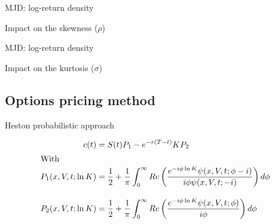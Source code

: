 \documentclass{beamer}
\begin{document}
\begin{frame}{MJD: log-return density}

\begin{block}{Impact on the skewness ($\rho$)}
\begin{figure}[ht]
\centering

\end{figure}
\end{block}
\end{frame}

\begin{frame}{MJD: log-return density}
\begin{block}{Impact on the kurtosis ($\sigma$)}
\begin{figure}[ht]
\centering

\end{figure}

\end{block}
 
\end{frame}





\subsection{Options pricing method}
\begin{frame}{Heston probabilistic approach}


\begin{align}
  c(t) &= S(t) P_1 - e^{-r(T-t)} K P_2 \notag \\
\intertext{With}
  P_1(x,V,t;\ln{K}) &= \frac{1}{2} + \frac{1}{\pi} \int_0^{\infty} Re \left( \frac{e^{-i\phi\ln{K}} \psi(x,V,t;\phi - i)}{i\phi\psi(x,V,t;-i)} \right) d\phi \notag \\ 
  \intertext{}
  P_2(x,V,t;\ln{K}) &= \frac{1}{2} + \frac{1}{\pi} \int_0^{\infty} Re \left( \frac{e^{-i\phi\ln{K}} \psi(x,V,t;\phi)}{i\phi} \right) d\phi \notag
\end{align}
  


 
\end{frame}

\end{document}
